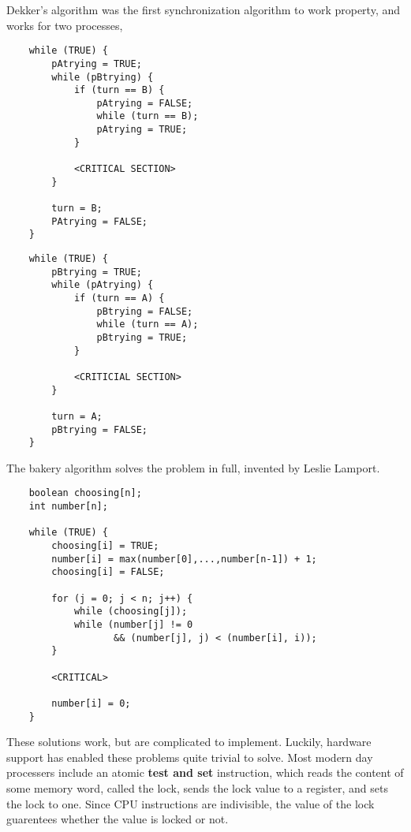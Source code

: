 Dekker's algorithm was the first synchronization algorithm to work property, and works for two processes,

\begin{multicols}{2}
\begin{verbatim}
    while (TRUE) {
        pAtrying = TRUE;
        while (pBtrying) {
            if (turn == B) {
                pAtrying = FALSE;
                while (turn == B);
                pAtrying = TRUE;
            }

            <CRITICAL SECTION>
        }

        turn = B;
        PAtrying = FALSE;
    }
\end{verbatim}

\begin{verbatim}
    while (TRUE) {
        pBtrying = TRUE;
        while (pAtrying) {
            if (turn == A) {
                pBtrying = FALSE;
                while (turn == A);
                pBtrying = TRUE;
            }

            <CRITICIAL SECTION>
        }

        turn = A;
        pBtrying = FALSE;
    }
\end{verbatim}
\end{multicols}

The bakery algorithm solves the problem in full, invented by Leslie Lamport.

\newpage

\begin{verbatim}
    boolean choosing[n];
    int number[n];

    while (TRUE) {
        choosing[i] = TRUE;
        number[i] = max(number[0],...,number[n-1]) + 1;
        choosing[i] = FALSE;

        for (j = 0; j < n; j++) {
            while (choosing[j]);
            while (number[j] != 0
                   && (number[j], j) < (number[i], i));
        }

        <CRITICAL>

        number[i] = 0;
    }
\end{verbatim}

These solutions work, but are complicated to implement. Luckily, hardware support has enabled these problems quite trivial to solve. Most modern day processers include an atomic {\bf test and set} instruction, which reads the content of some memory word, called the lock, sends the lock value to a register, and sets the lock to one. Since CPU instructions are indivisible, the value of the lock guarentees whether the value is locked or not.

